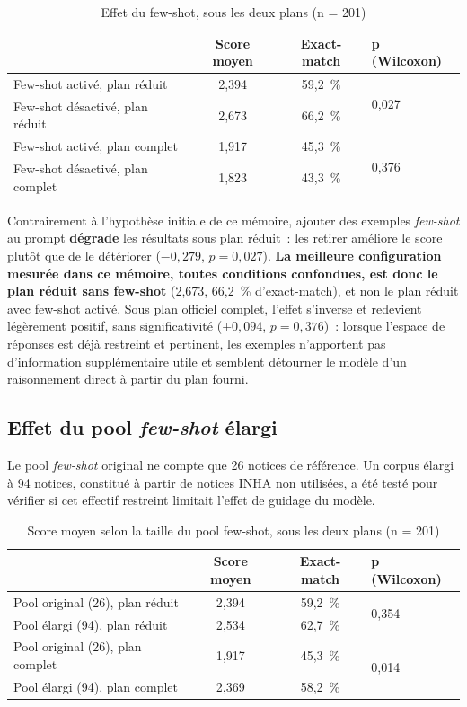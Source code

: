 \begin{table}[h]
\centering
\begin{tabular}{lccl}
\toprule
& \textbf{Score moyen} & \textbf{Exact-match} & \textbf{p (Wilcoxon)} \\
\midrule
Few-shot activé, plan réduit & 2,394 & 59,2~\% & \multirow{2}{*}{0,027} \\
Few-shot désactivé, plan réduit & 2,673 & 66,2~\% & \\
\midrule
Few-shot activé, plan complet & 1,917 & 45,3~\% & \multirow{2}{*}{0,376} \\
Few-shot désactivé, plan complet & 1,823 & 43,3~\% & \\
\bottomrule
\end{tabular}
\caption{Effet du few-shot, sous les deux plans (n = 201)}
\label{tab:fewshot-on-off}
\end{table}

Contrairement à l'hypothèse initiale de ce mémoire, ajouter des exemples \textit{few-shot} au prompt \textbf{dégrade} les résultats sous plan réduit~: les retirer améliore le score plutôt que de le détériorer ($-0{,}279$, $p=0{,}027$). \textbf{La meilleure configuration mesurée dans ce mémoire, toutes conditions confondues, est donc le plan réduit sans few-shot} (2,673, 66,2~\% d'exact-match), et non le plan réduit avec few-shot activé. Sous plan officiel complet, l'effet s'inverse et redevient légèrement positif, sans significativité ($+0{,}094$, $p=0{,}376$)~: lorsque l'espace de réponses est déjà restreint et pertinent, les exemples n'apportent pas d'information supplémentaire utile et semblent détourner le modèle d'un raisonnement direct à partir du plan fourni.

\subsection{Effet du pool \textit{few-shot} élargi}
\label{sec:effet-pool-elargi}

Le pool \textit{few-shot} original ne compte que 26 notices de référence. Un corpus élargi à 94 notices, constitué à partir de notices INHA non utilisées, a été testé pour vérifier si cet effectif restreint limitait l'effet de guidage du modèle.

\begin{table}[h]
\centering
\begin{tabular}{lccl}
\toprule
& \textbf{Score moyen} & \textbf{Exact-match} & \textbf{p (Wilcoxon)} \\
\midrule
Pool original (26), plan réduit & 2,394 & 59,2~\% & \multirow{2}{*}{0,354} \\
Pool élargi (94), plan réduit   & 2,534 & 62,7~\% & \\
\midrule
Pool original (26), plan complet & 1,917 & 45,3~\% & \multirow{2}{*}{0,014} \\
Pool élargi (94), plan complet   & 2,369 & 58,2~\% & \\
\bottomrule
\end{tabular}
\caption{Score moyen selon la taille du pool few-shot, sous les deux plans (n = 201)}
\label{tab:fewshot-pool}
\end{table}

